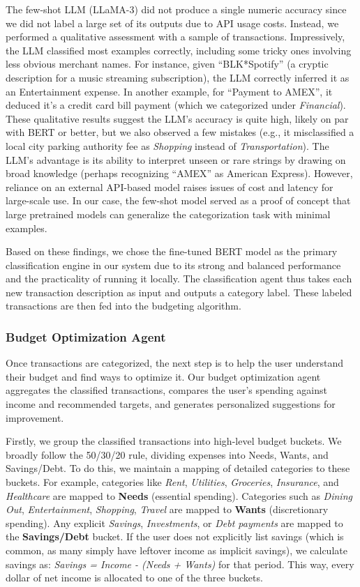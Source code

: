 \documentclass{scrartcl}
\begin{document}
The few-shot LLM (LLaMA-3) did not produce a single numeric accuracy since we did not label a large set of its outputs due to API usage costs. Instead, we performed a qualitative assessment with a sample of transactions. Impressively, the LLM classified most examples correctly, including some tricky ones involving less obvious merchant names. For instance, given “BLK*Spotify” (a cryptic description for a music streaming subscription), the LLM correctly inferred it as an Entertainment expense. In another example, for “Payment to AMEX”, it deduced it’s a credit card bill payment (which we categorized under \textit{Financial}). These qualitative results suggest the LLM’s accuracy is quite high, likely on par with BERT or better, but we also observed a few mistakes (e.g., it misclassified a local city parking authority fee as \textit{Shopping} instead of \textit{Transportation}). The LLM’s advantage is its ability to interpret unseen or rare strings by drawing on broad knowledge (perhaps recognizing “AMEX” as American Express). However, reliance on an external API-based model raises issues of cost and latency for large-scale use. In our case, the few-shot model served as a proof of concept that large pretrained models can generalize the categorization task with minimal examples.

Based on these findings, we chose the fine-tuned BERT model as the primary classification engine in our system due to its strong and balanced performance and the practicality of running it locally. The classification agent thus takes each new transaction description as input and outputs a category label. These labeled transactions are then fed into the budgeting algorithm.

\subsubsection{Budget Optimization Agent}
Once transactions are categorized, the next step is to help the user understand their budget and find ways to optimize it. Our budget optimization agent aggregates the classified transactions, compares the user's spending against income and recommended targets, and generates personalized suggestions for improvement.

Firstly, we group the classified transactions into high-level budget buckets. We broadly follow the 50/30/20 rule, dividing expenses into Needs, Wants, and Savings/Debt. To do this, we maintain a mapping of detailed categories to these buckets. For example, categories like \textit{Rent}, \textit{Utilities}, \textit{Groceries}, \textit{Insurance}, and \textit{Healthcare} are mapped to \textbf{Needs} (essential spending). Categories such as \textit{Dining Out}, \textit{Entertainment}, \textit{Shopping}, \textit{Travel} are mapped to \textbf{Wants} (discretionary spending). Any explicit \textit{Savings}, \textit{Investments}, or \textit{Debt payments} are mapped to the \textbf{Savings/Debt} bucket. If the user does not explicitly list savings (which is common, as many simply have leftover income as implicit savings), we calculate savings as: \textit{Savings = Income - (Needs + Wants)} for that period. This way, every dollar of net income is allocated to one of the three buckets.
\end{document}
